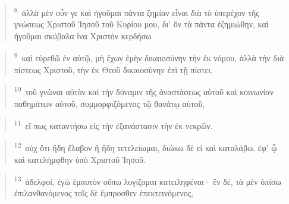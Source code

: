 \documentclass{article}
\newcommand{\currentverse}{1} %
\newcommand{\setcurrentverse}[1]{\renewcommand{\currentverse}{#1}}
\begin{document}
\begin{verse}

\setcurrentverse{8}

\setcounter{footnote}{0}

\textsuperscript{8}~ἀλλὰ μὲν οὖν γε καὶ ἡγοῦμαι πάντα ζημίαν εἶναι διὰ τὸ ὑπερέχον τῆς γνώσεως Χριστοῦ Ἰησοῦ τοῦ Κυρίου μου, δι’ ὃν τὰ πάντα ἐζημιώθην, καὶ ἡγοῦμαι σκύβαλα ἵνα Χριστὸν κερδήσω

\end{verse}

\begin{verse}

\setcurrentverse{9}

\setcounter{footnote}{0}

\textsuperscript{9}~καὶ εὑρεθῶ ἐν αὐτῷ, μὴ ἔχων ἐμὴν δικαιοσύνην τὴν ἐκ νόμου, ἀλλὰ τὴν διὰ πίστεως Χριστοῦ, τὴν ἐκ Θεοῦ δικαιοσύνην ἐπὶ τῇ πίστει,

\end{verse}

\begin{verse}

\setcurrentverse{10}

\setcounter{footnote}{0}

\textsuperscript{10}~τοῦ γνῶναι αὐτὸν καὶ τὴν δύναμιν τῆς ἀναστάσεως αὐτοῦ καὶ κοινωνίαν παθημάτων αὐτοῦ, συμμορφιζόμενος τῷ θανάτῳ αὐτοῦ,

\end{verse}

\begin{verse}

\setcurrentverse{11}

\setcounter{footnote}{0}

\textsuperscript{11}~εἴ πως καταντήσω εἰς τὴν ἐξανάστασιν τὴν ἐκ νεκρῶν.

\end{verse}

\begin{verse}

\setcurrentverse{12}

\setcounter{footnote}{0}

\textsuperscript{12}~οὐχ ὅτι ἤδη ἔλαβον ἢ ἤδη τετελείωμαι, διώκω δὲ εἰ καὶ καταλάβω, ἐφ’ ᾧ καὶ κατελήμφθην ὑπὸ Χριστοῦ Ἰησοῦ.

\end{verse}

\begin{verse}

\setcurrentverse{13}

\setcounter{footnote}{0}

\textsuperscript{13}~ἀδελφοί, ἐγὼ ἐμαυτὸν οὔπω λογίζομαι κατειληφέναι· ἓν δέ, τὰ μὲν ὀπίσω ἐπιλανθανόμενος τοῖς δὲ ἔμπροσθεν ἐπεκτεινόμενος,

\end{verse}
\end{document}

